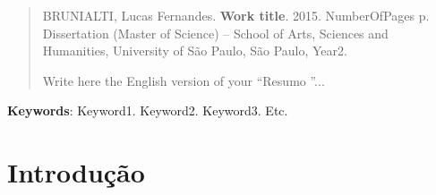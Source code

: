 \documentclass[normaltoc, espacoumemeio, pnumromarab,ruledheader]{abnt}
\begin{document}
%
%
%
%


\begin{abstract}
\begin{flushleft}
\noindent BRUNIALTI, Lucas Fernandes. \textbf{Work title}. 2015. NumberOfPages p. Dissertation (Master of Science) -- School of Arts, Sciences and Humanities, University of São Paulo, São Paulo, Year2.
\newline
\end{flushleft}


\noindent Write here the English version of your \textquotedblleft Resumo \textquotedblright...
\end{abstract}

\par
\vspace{2em}
\noindent \textbf{Keywords}: Keyword1. Keyword2. Keyword3. Etc.

\listoffigures

\listoftables



\tableofcontents


\chapter{Introdução}
\label{intro}

\end{document}
